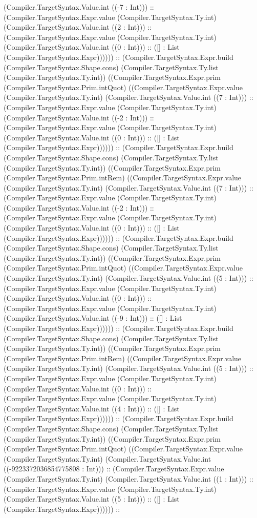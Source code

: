 \documentclass[11pt]{article}
\begin{document}
(Compiler.TargetSyntax.Value.int ((-7 : Int))) :: (Compiler.TargetSyntax.Expr.value (Compiler.TargetSyntax.Ty.int) (Compiler.TargetSyntax.Value.int ((2 : Int))) :: (Compiler.TargetSyntax.Expr.value (Compiler.TargetSyntax.Ty.int) (Compiler.TargetSyntax.Value.int ((0 : Int))) :: ([] : List (Compiler.TargetSyntax.Expr)))))) :: (Compiler.TargetSyntax.Expr.build (Compiler.TargetSyntax.Shape.cons) (Compiler.TargetSyntax.Ty.list (Compiler.TargetSyntax.Ty.int)) ((Compiler.TargetSyntax.Expr.prim (Compiler.TargetSyntax.Prim.intQuot) ((Compiler.TargetSyntax.Expr.value (Compiler.TargetSyntax.Ty.int) (Compiler.TargetSyntax.Value.int ((7 : Int))) :: (Compiler.TargetSyntax.Expr.value (Compiler.TargetSyntax.Ty.int) (Compiler.TargetSyntax.Value.int ((-2 : Int))) :: (Compiler.TargetSyntax.Expr.value (Compiler.TargetSyntax.Ty.int) (Compiler.TargetSyntax.Value.int ((0 : Int))) :: ([] : List (Compiler.TargetSyntax.Expr)))))) :: (Compiler.TargetSyntax.Expr.build (Compiler.TargetSyntax.Shape.cons) (Compiler.TargetSyntax.Ty.list (Compiler.TargetSyntax.Ty.int)) ((Compiler.TargetSyntax.Expr.prim (Compiler.TargetSyntax.Prim.intRem) ((Compiler.TargetSyntax.Expr.value (Compiler.TargetSyntax.Ty.int) (Compiler.TargetSyntax.Value.int ((7 : Int))) :: (Compiler.TargetSyntax.Expr.value (Compiler.TargetSyntax.Ty.int) (Compiler.TargetSyntax.Value.int ((-2 : Int))) :: (Compiler.TargetSyntax.Expr.value (Compiler.TargetSyntax.Ty.int) (Compiler.TargetSyntax.Value.int ((0 : Int))) :: ([] : List (Compiler.TargetSyntax.Expr)))))) :: (Compiler.TargetSyntax.Expr.build (Compiler.TargetSyntax.Shape.cons) (Compiler.TargetSyntax.Ty.list (Compiler.TargetSyntax.Ty.int)) ((Compiler.TargetSyntax.Expr.prim (Compiler.TargetSyntax.Prim.intQuot) ((Compiler.TargetSyntax.Expr.value (Compiler.TargetSyntax.Ty.int) (Compiler.TargetSyntax.Value.int ((5 : Int))) :: (Compiler.TargetSyntax.Expr.value (Compiler.TargetSyntax.Ty.int) (Compiler.TargetSyntax.Value.int ((0 : Int))) :: (Compiler.TargetSyntax.Expr.value (Compiler.TargetSyntax.Ty.int) (Compiler.TargetSyntax.Value.int ((-9 : Int))) :: ([] : List (Compiler.TargetSyntax.Expr)))))) :: (Compiler.TargetSyntax.Expr.build (Compiler.TargetSyntax.Shape.cons) (Compiler.TargetSyntax.Ty.list (Compiler.TargetSyntax.Ty.int)) ((Compiler.TargetSyntax.Expr.prim (Compiler.TargetSyntax.Prim.intRem) ((Compiler.TargetSyntax.Expr.value (Compiler.TargetSyntax.Ty.int) (Compiler.TargetSyntax.Value.int ((5 : Int))) :: (Compiler.TargetSyntax.Expr.value (Compiler.TargetSyntax.Ty.int) (Compiler.TargetSyntax.Value.int ((0 : Int))) :: (Compiler.TargetSyntax.Expr.value (Compiler.TargetSyntax.Ty.int) (Compiler.TargetSyntax.Value.int ((4 : Int))) :: ([] : List (Compiler.TargetSyntax.Expr)))))) :: (Compiler.TargetSyntax.Expr.build (Compiler.TargetSyntax.Shape.cons) (Compiler.TargetSyntax.Ty.list (Compiler.TargetSyntax.Ty.int)) ((Compiler.TargetSyntax.Expr.prim (Compiler.TargetSyntax.Prim.intQuot) ((Compiler.TargetSyntax.Expr.value (Compiler.TargetSyntax.Ty.int) (Compiler.TargetSyntax.Value.int ((-9223372036854775808 : Int))) :: (Compiler.TargetSyntax.Expr.value (Compiler.TargetSyntax.Ty.int) (Compiler.TargetSyntax.Value.int ((1 : Int))) :: (Compiler.TargetSyntax.Expr.value (Compiler.TargetSyntax.Ty.int) (Compiler.TargetSyntax.Value.int ((5 : Int))) :: ([] : List (Compiler.TargetSyntax.Expr)))))) :: 
\end{document}
